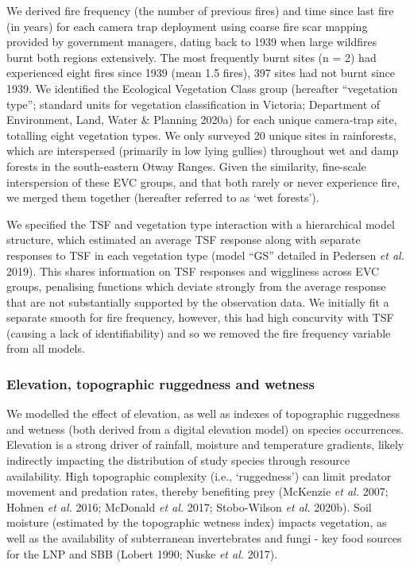 \documentclass[11pt,a4paper,titlepage,twoside,openright]{style/unimelbthesis}
\begin{document}
\begin{mainmatter}
We derived fire frequency (the number of previous fires) and time since last fire (in years) for each camera trap deployment using coarse fire scar mapping provided by government managers, dating back to 1939 when large wildfires burnt both regions extensively. The most frequently burnt sites (n = 2) had experienced eight fires since 1939 (mean 1.5 fires), 397 sites had not burnt since 1939. We identified the Ecological Vegetation Class group (hereafter ``vegetation type''; standard units for vegetation classification in Victoria; Department of Environment, Land, Water \& Planning 2020a) for each unique camera-trap site, totalling eight vegetation types. We only surveyed 20 unique sites in rainforests, which are interspersed (primarily in low lying gullies) throughout wet and damp forests in the south-eastern Otway Ranges. Given the similarity, fine-scale interspersion of these EVC groups, and that both rarely or never experience fire, we merged them together (hereafter referred to as `wet forests').

We specified the TSF and vegetation type interaction with a hierarchical model structure, which estimated an average TSF response along with separate responses to TSF in each vegetation type (model ``GS'' detailed in Pedersen \emph{et al.} 2019). This shares information on TSF responses and wiggliness across EVC groups, penalising functions which deviate strongly from the average response that are not substantially supported by the observation data. We initially fit a separate smooth for fire frequency, however, this had high concurvity with TSF (causing a lack of identifiability) and so we removed the fire frequency variable from all models.

\hypertarget{elevation-topographic-ruggedness-and-wetness}{%
\subsubsection{Elevation, topographic ruggedness and wetness}\label{elevation-topographic-ruggedness-and-wetness}}

We modelled the effect of elevation, as well as indexes of topographic ruggedness and wetness (both derived from a digital elevation model) on species occurrences. Elevation is a strong driver of rainfall, moisture and temperature gradients, likely indirectly impacting the distribution of study species through resource availability. High topographic complexity (i.e., `ruggedness') can limit predator movement and predation rates, thereby benefiting prey (McKenzie \emph{et al.} 2007; Hohnen \emph{et al.} 2016; McDonald \emph{et al.} 2017; Stobo-Wilson \emph{et al.} 2020b). Soil moisture (estimated by the topographic wetness index) impacts vegetation, as well as the availability of subterranean invertebrates and fungi - key food sources for the LNP and SBB (Lobert 1990; Nuske \emph{et al.} 2017).


\end{mainmatter}
\end{document}
